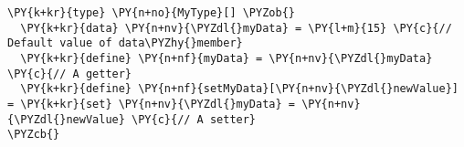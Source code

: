 \begin{Verbatim}[commandchars=\\\{\}]
\PY{k+kr}{type} \PY{n+no}{MyType}[] \PYZob{}
  \PY{k+kr}{data} \PY{n+nv}{\PYZdl{}myData} = \PY{l+m}{15} \PY{c}{// Default value of data\PYZhy{}member}
  \PY{k+kr}{define} \PY{n+nf}{myData} = \PY{n+nv}{\PYZdl{}myData} \PY{c}{// A getter}
  \PY{k+kr}{define} \PY{n+nf}{setMyData}[\PY{n+nv}{\PYZdl{}newValue}] = \PY{k+kr}{set} \PY{n+nv}{\PYZdl{}myData} = \PY{n+nv}{\PYZdl{}newValue} \PY{c}{// A setter}
\PYZcb{}
\end{Verbatim}
